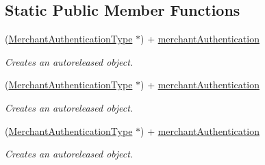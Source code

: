 \subsection*{Static Public Member Functions}
\begin{DoxyCompactItemize}
\item 
(\hyperlink{interface_merchant_authentication_type}{MerchantAuthenticationType} $\ast$) + \hyperlink{interface_merchant_authentication_type_ad43413799b4622a7a7a49f6bf42ac84d}{merchantAuthentication}
\begin{DoxyCompactList}\small\item\em Creates an autoreleased object. \item\end{DoxyCompactList}\item 
(\hyperlink{interface_merchant_authentication_type}{MerchantAuthenticationType} $\ast$) + \hyperlink{interface_merchant_authentication_type_ad43413799b4622a7a7a49f6bf42ac84d}{merchantAuthentication}
\begin{DoxyCompactList}\small\item\em Creates an autoreleased object. \item\end{DoxyCompactList}\item 
(\hyperlink{interface_merchant_authentication_type}{MerchantAuthenticationType} $\ast$) + \hyperlink{interface_merchant_authentication_type_ad43413799b4622a7a7a49f6bf42ac84d}{merchantAuthentication}
\begin{DoxyCompactList}\small\item\em Creates an autoreleased object. \item\end{DoxyCompactList}\end{DoxyCompactItemize}
